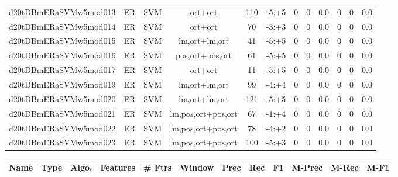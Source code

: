 \documentclass[a4paper]{article}
\begin{document}
\begin{landscape}
\begin{center}
\begin{tabular}{ |c|c|c|c|c|c|c|c|c|c|c|c|}
 
 	
 	\small{ d20tDBmERaSVMw5mod013 } & ER & SVM & ort+ort  &  110 &  -5:+5  &  0 & 0 & 0.0  &  0 & 0 & 0.0 \\
 	

 
 	
 	\small{ d20tDBmERaSVMw5mod014 } & ER & SVM & ort+ort  &  70 &  -3:+3  &  0 & 0 & 0.0  &  0 & 0 & 0.0 \\
 	

 
 	
 	\small{ d20tDBmERaSVMw5mod015 } & ER & SVM & lm,ort+lm,ort  &  41 &  -5:+5  &  0 & 0 & 0.0  &  0 & 0 & 0.0 \\
 	

 
 	
 	\small{ d20tDBmERaSVMw5mod016 } & ER & SVM & pos,ort+pos,ort  &  61 &  -5:+5  &  0 & 0 & 0.0  &  0 & 0 & 0.0 \\
 	

 
 	
 	\small{ d20tDBmERaSVMw5mod017 } & ER & SVM & ort+ort  &  11 &  -5:+5  &  0 & 0 & 0.0  &  0 & 0 & 0.0 \\
 	

 
 	
 	\small{ d20tDBmERaSVMw5mod019 } & ER & SVM & lm,ort+lm,ort  &  99 &  -4:+4  &  0 & 0 & 0.0  &  0 & 0 & 0.0 \\
 	

 
 	
 	\small{ d20tDBmERaSVMw5mod020 } & ER & SVM & lm,ort+lm,ort  &  121 &  -5:+5  &  0 & 0 & 0.0  &  0 & 0 & 0.0 \\
 	

 
 	
 	\small{ d20tDBmERaSVMw5mod021 } & ER & SVM & lm,pos,ort+pos,ort  &  67 &  -1:+4  &  0 & 0 & 0.0  &  0 & 0 & 0.0 \\
 	

 
 	
 	\small{ d20tDBmERaSVMw5mod022 } & ER & SVM & lm,pos,ort+pos,ort  &  78 &  -4:+2  &  0 & 0 & 0.0  &  0 & 0 & 0.0 \\
 	

 
 	
 	\small{ d20tDBmERaSVMw5mod023 } & ER & SVM & lm,pos,ort+pos,ort  &  100 &  -5:+3  &  0 & 0 & 0.0  &  0 & 0 & 0.0 \\
 	
 \hline
\end{tabular}
\end{center}




\begin{center}
\begin{tabular}{ |c|c|c|c|c|c|c|c|c|c|c|c|} 
 \hline
 	Name & Type & Algo. & Features & \# Ftrs & Window & Prec & Rec & F1 & M-Prec & M-Rec & M-F1\\
 \hline


\end{tabular}
\end{center}
\end{landscape}
\end{document}

